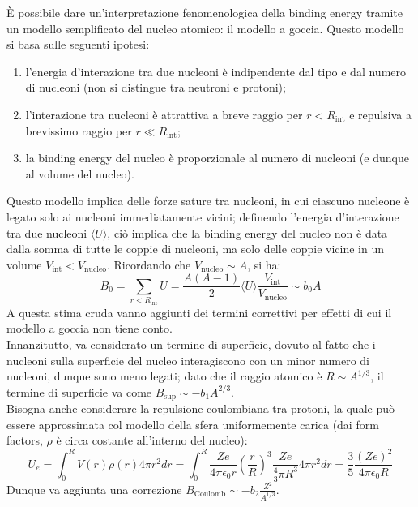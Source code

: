 È possibile dare un'interpretazione fenomenologica della binding energy tramite un modello semplificato del nucleo atomico: il modello a goccia. Questo modello si basa sulle seguenti ipotesi:
\begin{enumerate}
	\item l'energia d'interazione tra due nucleoni è indipendente dal tipo e dal numero di nucleoni (non si distingue tra neutroni e protoni);
	\item l'interazione tra nucleoni è attrattiva a breve raggio per $ r < R_{\text{int}} $ e repulsiva a brevissimo raggio per $ r \ll R_{\text{int}} $;
	\item la binding energy del nucleo è proporzionale al numero di nucleoni (e dunque al volume del nucleo).
\end{enumerate}
Questo modello implica delle forze sature tra nucleoni, in cui ciascuno nucleone è legato solo ai nucleoni immediatamente vicini; definendo l'energia d'interazione tra due nucleoni $ \langle U \rangle $, ciò implica che la binding energy del nucleo non è data dalla somma di tutte le coppie di nucleoni, ma solo delle coppie vicine in un volume $ V_{\text{int}} < V_{\text{nucleo}} $. Ricordando che $ V_{\text{nucleo}} \sim A $, si ha:
\begin{equation}
	B_0 = \sum_{r < R_{\text{int}}} U = \frac{A(A-1)}{2}\langle U \rangle \frac{V_{\text{int}}}{V_{\text{nucleo}}} \sim b_0 A
	\label{eq:1.26}
\end{equation}
A questa stima cruda vanno aggiunti dei termini correttivi per effetti di cui il modello a goccia non tiene conto.\\
Innanzitutto, va considerato un termine di superficie, dovuto al fatto che i nucleoni sulla superficie del nucleo interagiscono con un minor numero di nucleoni, dunque sono meno legati; dato che il raggio atomico è $ R \sim A^{1/3} $, il termine di superficie va come $ B_{\text{sup}} \sim - b_1 A^{2/3} $.\\
Bisogna anche considerare la repulsione coulombiana tra protoni, la quale può essere approssimata col modello della sfera uniformemente carica (dai form factors, $ \rho $ è circa costante all'interno del nucleo):
\begin{equation}
	 U_e = \int_0^R V(r) \rho(r) 4\pi r^2 dr = \int_0^R \frac{Ze}{4\pi \epsilon_0 r} \left( \frac{r}{R} \right)^3 \frac{Ze}{\frac{4}{3}\pi R^3} 4\pi r^2 dr = \frac{3}{5} \frac{(Ze)^2}{4\pi \epsilon_0 R}
	\label{eq:1.27}
\end{equation}
Dunque va aggiunta una correzione $ B_{\text{Coulomb}} \sim - b_2 \frac{Z^2}{A^{1/3}} $.\\
